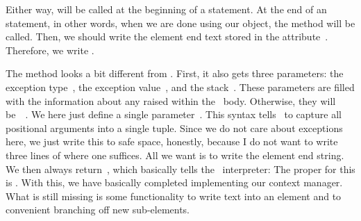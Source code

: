 %
%
%
Either way,  will be called at the beginning of a  statement.
At the end of an  statement, in other words, when we are done using our object, the  method will be called.
Then, we should write the element end text stored in the attribute~.
Therefore, we write .

The  method looks a bit different from .
First, it also gets three parameters: the exception type~, the exception value~, and the stack~.
These parameters are filled with the information about any  raised within the ~body.
Otherwise, they will be~~\cite{PSF:P3D:TPLR:WSCM}.
We here just define a single parameter~.
This syntax tells \python\ to capture all positional arguments into a single tuple.
Since we do not care about exceptions here, we just write this to safe space, honestly, because I do not want to write three lines of  where one suffices.
All we want is to write the element end string.
We then always return~, which basically tells the \python~interpreter:
\emph{}
The proper  for this is .%
%
%
%
With this, we have basically completed implementing our context manager.
What is still missing is some functionality to write text into an element and to convenient branching off new sub-elements.

